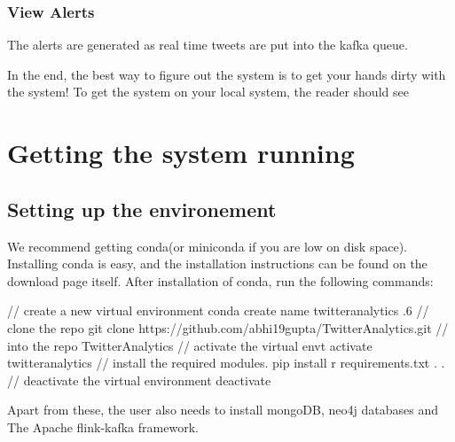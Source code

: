 \documentclass[letterpaper,10pt,english]{sphinxmanual}
\begin{document}
\noindent{}


\subsection{View Alerts}
\label{\detokenize{dashboard_website:view-alerts}}
The alerts are generated as real time tweets are put into the kafka queue.

\noindent{}

In the end, the best way to figure out the system is to get your hands dirty with the system! To get the system on your local system, the reader should see {\hyperref[\detokenize{running:getting-the-system-running}]{}}


\chapter{Getting the system running}
\label{\detokenize{running:getting-the-system-running}}\label{\detokenize{running::doc}}

\section{Setting up the environement}
\label{\detokenize{running:setting-up-the-environement}}
We recommend getting conda(or miniconda if you are low on disk space). Installing conda is easy, and the installation instructions can be found on the download page itself. After installation of conda, run the following commands:

%
\begin{sphinxVerbatim}[commandchars=\\\{\}]
// create a new virtual environment
conda create \PYGZhy{}\PYGZhy{}name twitter\PYGZus{}analytics .6
// clone the repo
git clone https://github.com/abhi19gupta/TwitterAnalytics.git
//  into the repo
 TwitterAnalytics
// activate the virtual envt
 activate twitter\PYGZus{}analytics
// install the required modules.
pip install \PYGZhy{}r requirements.txt
.
.
// deactivate the virtual environment
 deactivate
\end{sphinxVerbatim}

Apart from these, the user also needs to install mongoDB, neo4j databases and The Apache flink-kafka framework.
\end{document}
